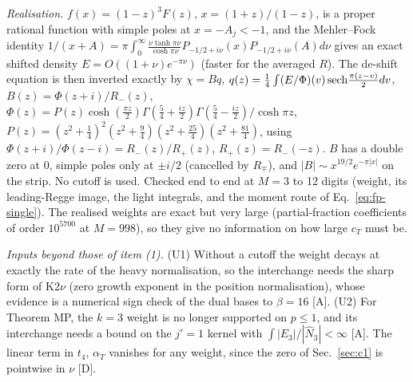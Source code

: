 \emph{Realisation.} $f(x)=(1-z)^3F(z)$, $x=(1+z)/(1-z)$, is a proper rational function with simple poles at $x=-A_j<-1$, and the
Mehler--Fock identity $1/(x+A)=\pi\int_0^\infty\frac{\nu\tanh\pi\nu}{\cosh\pi\nu}P_{-1/2+i\nu}(x)P_{-1/2+i\nu}(A)d\nu$ gives an exact
shifted density $E=O((1+\nu)e^{-\pi\nu})$ (faster for the averaged $R$). The de-shift equation is then inverted exactly by
$\chi=Bq$, $q(z)=\tfrac14\int(E/\Phi)(v)\,{\rm sech}\frac{\pi(z-v)}2dv$, $B(z)=\Phi(z+i)/R_-(z)$, $\Phi(z)=P(z)\cosh(\tfrac{\pi z}2)
\Gamma(\tfrac54+\tfrac{iz}2)\Gamma(\tfrac54-\tfrac{iz}2)/\cosh\pi z$, $P(z)=(z^2+\tfrac14)^2(z^2+\tfrac94)(z^2+\tfrac{25}4)(z^2+\tfrac{81}4)$,
using $\Phi(z+i)/\Phi(z-i)=R_-(z)/R_+(z)$, $R_+(z)=R_-(-z)$. $B$ has a double zero at $0$, simple poles only at $\pm i/2$ (cancelled by
$R_\mp$), and $|B|\sim x^{19/2}e^{-\pi|x|}$ on the strip. No cutoff is used. Checked end to end at $M=3$ to 12 digits (weight, its
leading-Regge image, the light integrals, and the moment route of Eq.~\eqref{eq:fp-single}). The realised weights are exact but very
large (partial-fraction coefficients of order $10^{5700}$ at $M=998$), so they give no information on how large $c_T$ must be.

\emph{Inputs beyond those of item (1).} (U1) Without a cutoff the weight decays at exactly the rate of the heavy normalisation, so the
interchange needs the sharp form of K2$\nu$ (zero growth exponent in the position normalisation), whose evidence is a numerical
sign check of the dual bases to $\beta=16$ [A]. (U2) For Theorem MP, the $k=3$ weight is no longer supported on $p\le1$, and its
interchange needs a bound on the $j'=1$ kernel with $\int|E_3|/|\hat N_3|<\infty$ [A]. The linear term in $t_4$, $\alpha_T$ vanishes for any
weight, since the zero of Sec.~\ref{sec:c1} is pointwise in $\nu$ [D].

